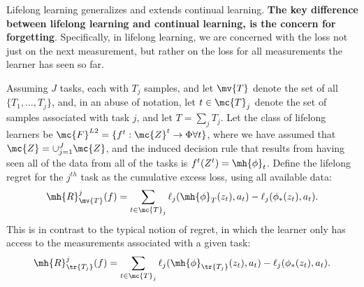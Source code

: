 \documentclass{article}
\begin{document}
Lifelong learning generalizes and extends continual learning.  \textbf{The key difference between lifelong learning and continual learning, is the concern for forgetting}.  Specifically, in lifelong learning, we are concerned with the loss not just on the next measurement, but rather on the loss for all measurements the learner has seen so far. 



Assuming $J$ tasks, each with $T_j$ samples, and let $\mv{T}$ denote the set of all $\{T_1,\ldots, T_j\}$, and, in an abuse of notation, let $t \in \mc{T}_j$ denote the set of samples associated with task $j$, and let $T=\sum_j T_j$.  
Let the class of lifelong learners be $\mc{F}^{L2}=\{f^t: \mc{Z}^t \to \Phi \forall t\}$, where we have assumed that $\mc{Z} = \cup_{j=1}^J \mc{Z}$, and 
 the induced decision rule that results from having seen all of the data from all of the tasks is $f^t(Z^t) = \mh{\phi}_t$.  
Define the lifelong regret for the $j^{th}$ task as the cumulative excess loss, using all available data:
\begin{align}
    \mh{R}_{\mv{T}}^j(f) =   \sum_{t \in \mc{T}_j}   \ell_j (\mh{\phi}_{T}(z_t), a_t) - \ell_j (\phi_*(z_t),a_t).
\end{align}
% 
This is in contrast to the typical notion of regret, in which the learner only has access to the measurements associated with a given task:
\begin{align}
    \mh{R}_{\tr{T_j}}^j(f) =   \sum_{t \in \mc{T}_j}   \ell_j (\mh{\phi}_{\tr{T_j}}(z_t), a_t) - \ell_j (\phi_*(z_t),a_t).
\end{align}
% 
\end{document}
